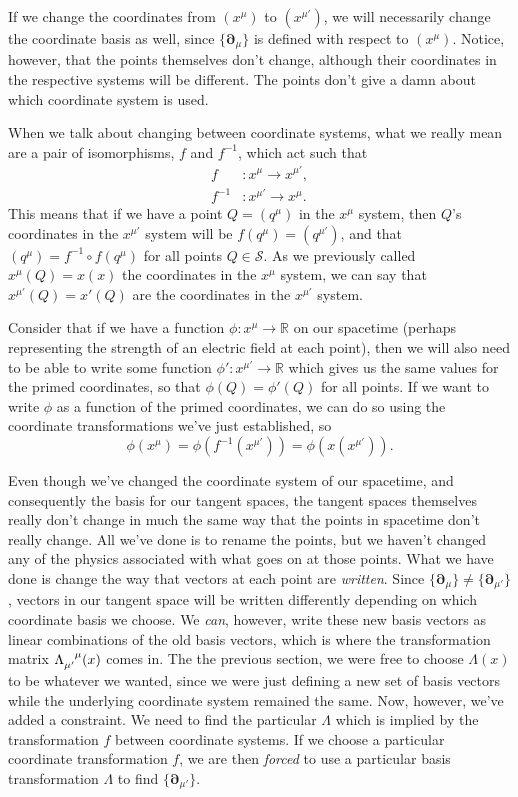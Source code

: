 If we change the coordinates from $(x^\mu)$ to $(x^{\mu'})$, we will necessarily change the coordinate basis as well, since $\{\bm{\partial}_\mu\}$ is defined with respect to $(x^\mu)$.
Notice, however, that the points themselves don't change, although their coordinates in the respective systems will be different.
The points don't give a damn about which coordinate system is used.

When we talk about changing between coordinate systems, what we really mean are a pair of isomorphisms, $f$ and $f^{-1}$, which act such that
\begin{align*}
    f &: x^\mu \to x^{\mu'}, \\
    f^{-1} &: x^{\mu'} \to x^\mu.
\end{align*}
This means that if we have a point $Q = (q^\mu)$ in the $x^\mu$ system, then $Q$'s coordinates in the $x^{\mu'}$ system will be $f(q^\mu) = (q^{\mu'})$, and that $(q^\mu) = f^{-1} \circ f (q^\mu)$ for all points $Q \in \mathcal{S}$.
As we previously called $x^\mu (Q) = x(x)$ the coordinates in the $x^\mu$ system, we can say that $x^{\mu'}(Q) = x'(Q)$ are the coordinates in the $x^{\mu'}$ system.

Consider that if we have a function $\phi : x^\mu \to \mathbb{R}$ on our spacetime (perhaps representing the strength of an electric field at each point), then we will also need to be able to write some function $\phi' : x^{\mu'} \to \mathbb{R}$ which gives us the same values for the primed coordinates, so that $\phi(Q) = \phi'(Q)$ for all points.
If we want to write $\phi$ as a function of the primed coordinates, we can do so using the coordinate transformations we've just established, so 
\[ \phi(x^\mu) = \phi(f^{-1}(x^{\mu'})) = \phi(x(x^{\mu'})). \]

Even though we've changed the coordinate system of our spacetime, and consequently the basis for our tangent spaces, the tangent spaces themselves really don't change in much the same way that the points in spacetime don't really change.
All we've done is to rename the points, but we haven't changed any of the physics associated with what goes on at those points.
What we have done is change the way that vectors at each point are \emph{written}.
Since $\{\bm{\partial}_\mu\} \not= \{\bm{\partial}_{\mu'}\}$, vectors in our tangent space will be written differently depending on which coordinate basis we choose.
We \emph{can}, however, write these new basis vectors as linear combinations of the old basis vectors, which is where the transformation matrix $\tensor{\Lambda}{_{\mu'}^{\mu}}(x)$ comes in.
The the previous section, we were free to choose $\Lambda(x)$ to be whatever we wanted, since we were just defining a new set of basis vectors while the underlying coordinate system remained the same.
Now, however, we've added a constraint.
We need to find the particular $\Lambda$ which is implied by the transformation $f$ between coordinate systems.
If we choose a particular coordinate transformation $f$, we are then \emph{forced} to use a particular basis transformation $\Lambda$ to find $\{\bm{\partial}_{\mu'}\}$.

